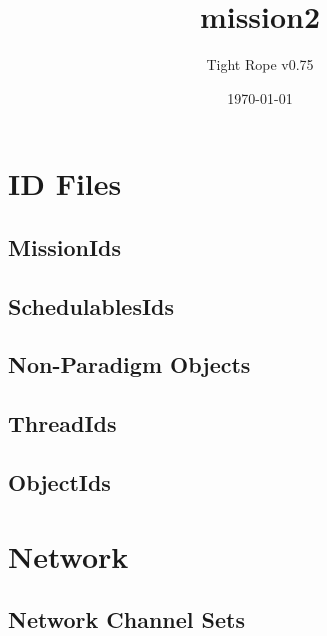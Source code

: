 \documentclass[10pt,a4paper]{article}
\title{mission2}
\author{Tight Rope v0.75}
\date{\today}
\begin{document}
\maketitle

\section{ID Files}
\subsection{MissionIds}

\newpage

\subsection{SchedulablesIds}

\newpage

\subsection{Non-Paradigm Objects}
\newpage

\subsection{ThreadIds}

\newpage

\subsection{ObjectIds}

\newpage

\section{Network}
\subsection{Network Channel Sets}




{}
\end{document}
